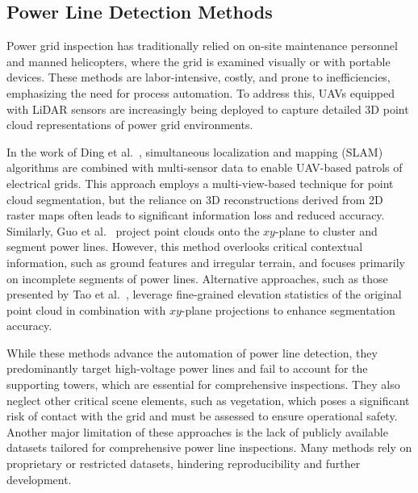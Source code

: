 \subsection{Power Line Detection Methods}

Power grid inspection has traditionally relied on on-site maintenance personnel and manned helicopters, where the grid is examined visually or with portable devices. These methods are labor-intensive, costly, and prone to inefficiencies, emphasizing the need for process automation. To address this, UAVs equipped with LiDAR sensors are increasingly being deployed to capture detailed 3D point cloud representations of power grid environments.

In the work of Ding et al.~\cite{ding2021electric}, simultaneous localization and mapping (SLAM) algorithms are combined with multi-sensor data to enable UAV-based patrols of electrical grids. This approach employs a multi-view-based technique for point cloud segmentation, but the reliance on 3D reconstructions derived from 2D raster maps often leads to significant information loss and reduced accuracy. 
%
Similarly, Guo et al.~\cite{guo2019research} project point clouds onto the $xy$-plane to cluster and segment power lines. However, this method overlooks critical contextual information, such as ground features and irregular terrain, and focuses primarily on incomplete segments of power lines. Alternative approaches, such as those presented by Tao et al.~\cite{tao2019study}, leverage fine-grained elevation statistics of the original point cloud in combination with $xy$-plane projections to enhance segmentation accuracy.

While these methods advance the automation of power line detection, they predominantly target high-voltage power lines and fail to account for the supporting towers, which are essential for comprehensive inspections. 
%
They also neglect other critical scene elements, such as vegetation, which poses a significant risk of contact with the grid and must be assessed to ensure operational safety.
%
Another major limitation of these approaches is the lack of publicly available datasets tailored for comprehensive power line inspections. Many methods rely on proprietary or restricted datasets, hindering reproducibility and further development.